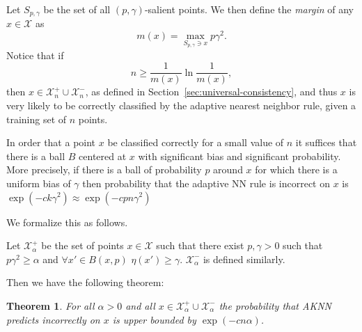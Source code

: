 \documentclass{article}
\def\X{{\mathcal X}}
\newtheorem{thm}{Theorem}
\begin{document}
Let $S_{p, \gamma}$ be the set of all $(p, \gamma)$-salient points. We then define the {\it margin} of any $x \in \X$ as
$$ m(x) = \max_{S_{p, \gamma} \ni x} p \gamma^2 .$$
Notice that if 
$$ n \geq \frac{1}{m(x)} \ln \frac{1}{m(x)} ,$$
then $x \in \X_n^+ \cup \X_n^-$, as defined in Section~\ref{sec:universal-consistency}, and thus $x$ is very likely to be correctly classified by the adaptive nearest neighbor rule, given a training set of $n$ points.



In order that a point $x$ be classified correctly for a small value of $n$ it suffices that there is a ball $B$ centered at $x$ with significant bias and significant probability. More precisely, if there is a ball of probability $p$ around $x$ for which there is a uniform bias of $\gamma$ then probability that the adaptive NN rule is incorrect 
on $x$ is $\exp(-c k \gamma^2) \approx \exp(-c p n \gamma^2)$

We formalize this as follows.

Let $\X_{\alpha}^+$ be the set of points $x \in \X$ such that there exist $p,\gamma>0$ such that $p \gamma^2 \geq \alpha$ and  $\forall x' \in B(x,p)$ $\eta(x')\geq \gamma$. $\X_{\alpha}^-$ is defined similarly.

Then we have the following theorem:
\begin{thm}
For all $\alpha>0$ and all $x \in \X_{\alpha}^+ \cup \X_{\alpha}^-$ the probability that AKNN predicts incorrectly on $x$ is upper bounded by $\exp(-c n \alpha)$.
\end{thm}
\end{document}

